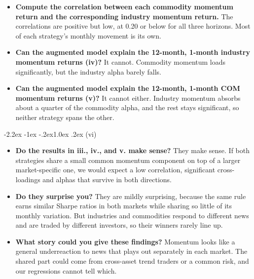 \documentclass[11pt]{article}
\makeatletter
\renewcommand\subsection{\@startsection{subsection}{2}{0pt}%
  {-2.2ex \@plus -1ex \@minus -.2ex}{1.0ex \@plus .2ex}%
  {\normalfont\bfseries\normalsize\color{psink}}}
\makeatother
\begin{document}
\begin{itemize}
\setlength{\itemsep}{4pt}\setlength{\parskip}{0pt}

\item \textbf{Compute the correlation between each commodity momentum return and the corresponding industry momentum return.} The correlations are positive but low, at 0.20 or below for all three horizons. Most of each strategy's monthly movement is its own.

\item \textbf{Can the augmented model explain the 12-month, 1-month industry momentum returns (iv)?} It cannot. Commodity momentum loads significantly, but the industry alpha barely falls.

\item \textbf{Can the augmented model explain the 12-month, 1-month COM momentum returns (v)?} It cannot either. Industry momentum absorbs about a quarter of the commodity alpha, and the rest stays significant, so neither strategy spans the other.

\end{itemize}

\subsection{(vi)}

\begin{itemize}
\setlength{\itemsep}{4pt}\setlength{\parskip}{0pt}

\item \textbf{Do the results in iii., iv., and v. make sense?} They make sense. If both strategies share a small common momentum component on top of a larger market-specific one, we would expect a low correlation, significant cross-loadings and alphas that survive in both directions.

\item \textbf{Do they surprise you?} They are mildly surprising, because the same rule earns similar Sharpe ratios in both markets while sharing so little of its monthly variation. But industries and commodities respond to different news and are traded by different investors, so their winners rarely line up.

\item \textbf{What story could you give these findings?} Momentum looks like a general underreaction to news that plays out separately in each market. The shared part could come from cross-asset trend traders or a common risk, and our regressions cannot tell which.

\end{itemize}
\end{document}
